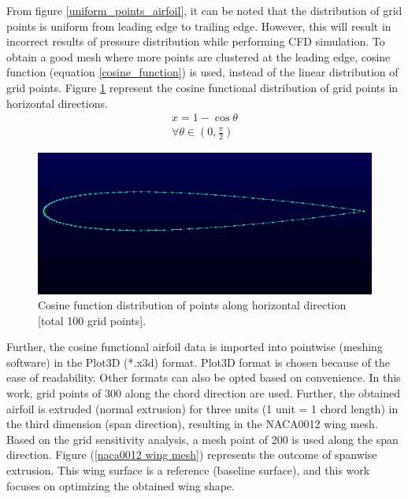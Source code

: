 From figure \ref{uniform_points_airfoil}, it can be noted that the distribution of grid points is uniform from leading edge to trailing edge. However, this will result in incorrect results of pressure distribution while performing CFD simulation. To obtain a good mesh where more points are clustered at the leading edge, cosine function (equation \ref{cosine_function}) is used, instead of the linear distribution of grid points. Figure \ref{cosine_points_airfoil} represent the cosine functional distribution of grid points in horizontal directions.
\begin{equation}
    \begin{array}{l}
        x = 1 - \cos{\theta}  \\
        \forall  \theta \in \left(0, \frac{\pi}{2}\right)
    \end{array}
\label{cosine_function}
\end{equation}

\begin{figure}[!htbp]
    \centering
    \includegraphics[scale = 0.4]{figures/airfoil_cosine.png}
    \caption{Cosine function distribution of points along horizontal direction [total 100 grid points].}
    \label{cosine_points_airfoil}
\end{figure}

Further, the cosine functional airfoil data is imported into pointwise (meshing software) in the Plot3D (*.x3d) format. Plot3D format is chosen because of the ease of readability. Other formats can also be opted based on convenience. In this work, grid points of 300 along the chord direction are used. Further, the obtained airfoil is extruded (normal extrusion) for three units (1 unit = 1 chord length) in the third dimension (span direction), resulting in the NACA0012 wing mesh. Based on the grid sensitivity analysis, a mesh point of 200 is used along the span direction. Figure (\ref{naca0012 wing mesh}) represents the outcome of spanwise extrusion. This wing surface is a reference (baseline surface), and this work focuses on optimizing the obtained wing shape. 

